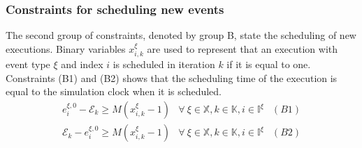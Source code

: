 \documentclass[suppldata]{interact}
\theoremstyle{plain}
\theoremstyle{definition}
\theoremstyle{remark}
\begin{document}
\subsubsection{Constraints for scheduling new events}\label{sec:const_B}
The second group of constraints, denoted by group B, state the scheduling of new executions. Binary variables $x^{\xi}_{i,k}$ are used to represent that an execution with event type $\xi$ and index $i$ is scheduled in iteration $k$ if it is equal to one. %
Constraints (B1) and (B2) shows that the scheduling time of the execution is equal to the simulation clock when it is scheduled.
\begin{eqnarray}
	e^{\xi,0}_i-\mathcal{E}_{k} \ge M(x^{\xi}_{i,k}-1)& \forall\ \xi\in \mathbb{X},k\in \mathbb{K},i\in \mathbb{I}^{\xi}&(B1)\nonumber\\
	\mathcal{E}_{k} -e^{\xi,0}_i\ge M(x^{\xi}_{i,k}-1)&\forall\ \xi\in \mathbb{X},k\in \mathbb{K},i\in \mathbb{I}^{\xi}&(B2)\nonumber
\end{eqnarray}
\end{document}
